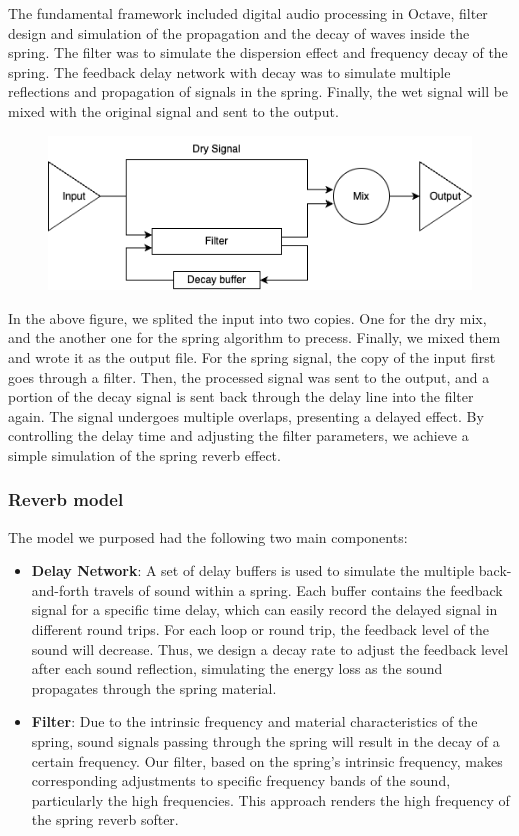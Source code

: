 \documentclass[12pt]{article}
\begin{document}
The fundamental framework included digital audio processing in Octave, filter design and simulation of the propagation and the decay of waves inside the spring. The filter was to simulate the dispersion effect and frequency decay of the spring. The feedback delay network with decay was to simulate multiple reflections and propagation of signals in the spring. Finally, the wet signal will be mixed with the original signal and sent to the output. 

\begin{figure}[h]
	\center
	\includegraphics[width=0.6\linewidth]{reverb.drawio.png}
\end{figure}

In the above figure, we splited the input into two copies. One for the dry mix, and the another one for the spring algorithm to precess. Finally, we mixed them and wrote it as the output file. For the spring signal, the copy of the input first goes through a filter. Then, the processed signal was sent to the output, and a portion of the decay signal is sent back through the delay line into the filter again. The signal undergoes multiple overlaps, presenting a delayed effect. By controlling the delay time and adjusting the filter parameters, we achieve a simple simulation of the spring reverb effect.

\subsubsection{Reverb model}

The model we purposed had the following two main components:
\begin{itemize}
	\item \textbf{Delay Network}: A set of delay buffers is used to simulate the multiple back-and-forth travels of sound within a spring. Each buffer contains the feedback signal for a specific time delay, which can easily record the delayed signal in different round trips. For each loop or round trip, the feedback level of the sound will decrease. Thus, we design a decay rate to adjust the feedback level after each sound reflection, simulating the energy loss as the sound propagates through the spring material.
	
	\item \textbf{Filter}: Due to the intrinsic frequency and material characteristics of the spring, sound signals passing through the spring will result in the decay of a certain frequency. Our filter, based on the spring's intrinsic frequency, makes corresponding adjustments to specific frequency bands of the sound, particularly the high frequencies. This approach renders the high frequency of the spring reverb softer. 
	
\end{itemize}
\end{document}
